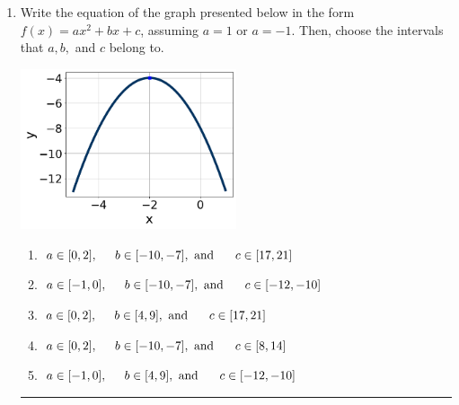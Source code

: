\documentclass[14pt]{extbook}
\newcommand{\litem}[1]{\item#1\hspace*{-1cm}\rule{\textwidth}{0.4pt}}
\begin{document}
\begin{enumerate}
{\begin{enumerate}[label=\Alph*.]
\end{enumerate} }
\litem{
Write the equation of the graph presented below in the form $f(x)=ax^2+bx+c$, assuming  $a=1$ or $a=-1$. Then, choose the intervals that $a, b,$ and $c$ belong to.
\begin{center}
    \includegraphics[width=0.5\textwidth]{../Figures/quadraticGraphToEquationCopyB.png}
\end{center}
\begin{enumerate}[label=\Alph*.]
\item \( a \in [0, 2], \hspace*{5mm} b \in [-10, -7], \text{ and } \hspace*{5mm} c \in [17, 21] \)
\item \( a \in [-1, 0], \hspace*{5mm} b \in [-10, -7], \text{ and } \hspace*{5mm} c \in [-12, -10] \)
\item \( a \in [0, 2], \hspace*{5mm} b \in [4, 9], \text{ and } \hspace*{5mm} c \in [17, 21] \)
\item \( a \in [0, 2], \hspace*{5mm} b \in [-10, -7], \text{ and } \hspace*{5mm} c \in [8, 14] \)
\item \( a \in [-1, 0], \hspace*{5mm} b \in [4, 9], \text{ and } \hspace*{5mm} c \in [-12, -10] \)


\end{enumerate}}
\end{enumerate}
\end{document}
